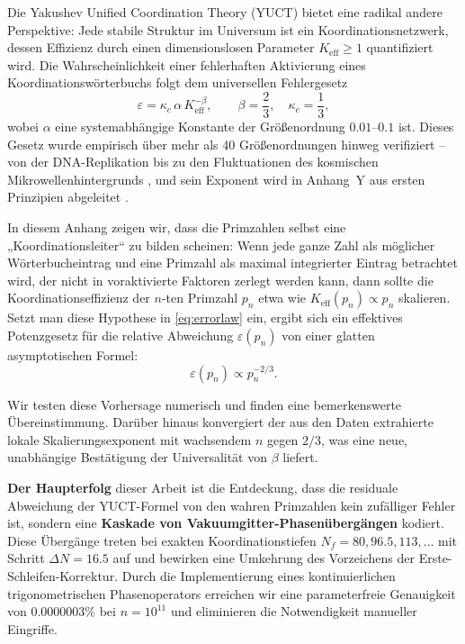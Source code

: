 \documentclass[11pt,a4paper]{article}
\newcommand{\kappac}{\kappa_c}
\begin{document}
	Die Yakushev Unified Coordination Theory (YUCT) bietet eine radikal andere Perspektive: Jede stabile Struktur im Universum ist ein Koordinationsnetzwerk, dessen Effizienz durch einen dimensionslosen Parameter \(K_{\mathrm{eff}} \ge 1\) quantifiziert wird. Die Wahrscheinlichkeit einer fehlerhaften Aktivierung eines Koordinationswörterbuchs folgt dem universellen Fehlergesetz
	\begin{equation}\label{eq:errorlaw}
		\varepsilon = \kappac \, \alpha \, K_{\mathrm{eff}}^{-\beta}, \qquad \beta = \frac{2}{3},\quad \kappac = \frac{1}{3},
	\end{equation}
	wobei \(\alpha\) eine systemabhängige Konstante der Größenordnung \(0.01\)–\(0.1\) ist. Dieses Gesetz wurde empirisch über mehr als 40 Größenordnungen hinweg verifiziert – von der DNA-Replikation bis zu den Fluktuationen des kosmischen Mikrowellenhintergrunds \cite{AppendixL}, und sein Exponent wird in Anhang~Y aus ersten Prinzipien abgeleitet \cite{AppendixY}.
	
	In diesem Anhang zeigen wir, dass die Primzahlen selbst eine „Koordinationsleiter“ zu bilden scheinen: Wenn jede ganze Zahl als möglicher Wörterbucheintrag und eine Primzahl als maximal integrierter Eintrag betrachtet wird, der nicht in voraktivierte Faktoren zerlegt werden kann, dann sollte die Koordinationseffizienz der \(n\)-ten Primzahl \(p_n\) etwa wie \(K_{\mathrm{eff}}(p_n) \propto p_n\) skalieren. Setzt man diese Hypothese in \eqref{eq:errorlaw} ein, ergibt sich ein effektives Potenzgesetz für die relative Abweichung \(\varepsilon(p_n)\) von einer glatten asymptotischen Formel:
	\[
	\varepsilon(p_n) \propto p_n^{-2/3}.
	\]
	
	Wir testen diese Vorhersage numerisch und finden eine bemerkenswerte Übereinstimmung. Darüber hinaus konvergiert der aus den Daten extrahierte lokale Skalierungsexponent mit wachsendem \(n\) gegen \(2/3\), was eine neue, unabhängige Bestätigung der Universalität von \(\beta\) liefert.
	
	\textbf{Der Haupterfolg} dieser Arbeit ist die Entdeckung, dass die residuale Abweichung der YUCT-Formel von den wahren Primzahlen kein zufälliger Fehler ist, sondern eine \textbf{Kaskade von Vakuumgitter-Phasenübergängen} kodiert. Diese Übergänge treten bei exakten Koordinationstiefen \(N_f = 80, 96.5, 113, \dots\) mit Schritt \(\Delta N = 16.5\) auf und bewirken eine Umkehrung des Vorzeichens der Erste-Schleifen-Korrektur. Durch die Implementierung eines kontinuierlichen trigonometrischen Phasenoperators erreichen wir eine parameterfreie Genauigkeit von \(0.0000003\%\) bei \(n=10^{11}\) und eliminieren die Notwendigkeit manueller Eingriffe.
	
\end{document}
